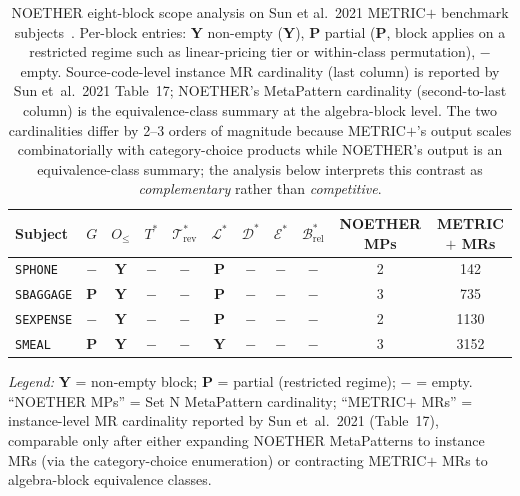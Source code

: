 \documentclass[acmsmall, screen]{acmart}
\newcommand{\cmark}{\textbf{Y}}
\newcommand{\xmark}{\ensuremath{-}}
\newcommand{\tildemark}{\textbf{P}}
\begin{document}
\begin{table}[h]
\centering
\caption{NOETHER eight-block scope analysis on Sun et al.~2021 METRIC$+$
benchmark subjects~\cite{SunMETRICplus2021}. Per-block entries: \textbf{Y}
non-empty (\cmark), \textbf{P} partial (\tildemark, block applies on a
restricted regime such as linear-pricing tier or within-class
permutation), \xmark{} empty. Source-code-level instance MR cardinality
(last column) is
reported by Sun et~al.\ 2021 Table~17; NOETHER's MetaPattern cardinality
(second-to-last column) is the equivalence-class summary at the
algebra-block level. The two cardinalities differ by 2--3 orders of
magnitude because METRIC$+$'s output scales combinatorially with
category-choice products while NOETHER's output is an equivalence-class
summary; the analysis below interprets this contrast as
\emph{complementary} rather than \emph{competitive}.}
\label{tab:metricplus-sun2021-scope}
\footnotesize
\begin{tabular}{l c c c c c c c c c c}
\toprule
Subject & $G$ & $O_{\le}$ & $T^{*}$ & $\mathcal{T}^{*}_{\mathrm{rev}}$ & $\mathcal{L}^{*}$ & $\mathcal{D}^{*}$ & $\mathcal{E}^{*}$ & $\mathcal{B}^{*}_{\mathrm{rel}}$ & NOETHER MPs & METRIC$+$ MRs \\
\midrule
\texttt{SPHONE}    & \xmark   & \cmark   & \xmark & \xmark & \tildemark & \xmark & \xmark & \xmark & 2 & 142 \\
\texttt{SBAGGAGE}  & \tildemark & \cmark & \xmark & \xmark & \tildemark & \xmark & \xmark & \xmark & 3 & 735 \\
\texttt{SEXPENSE}  & \xmark   & \cmark   & \xmark & \xmark & \tildemark & \xmark & \xmark & \xmark & 2 & 1130 \\
\texttt{SMEAL}     & \tildemark & \cmark & \xmark & \xmark & \cmark   & \xmark & \xmark & \xmark & 3 & 3152 \\
\bottomrule
\end{tabular}

\smallskip
\footnotesize
\textit{Legend:} \textbf{Y} = non-empty block; \textbf{P} = partial
(restricted regime); \xmark{} = empty. ``NOETHER MPs'' = Set N
MetaPattern cardinality; ``METRIC$+$ MRs'' = instance-level MR
cardinality reported by Sun et~al.~2021 (Table~17), comparable
only after either expanding NOETHER MetaPatterns to instance MRs
(via the category-choice enumeration) or contracting METRIC$+$ MRs
to algebra-block equivalence classes.
\end{table}
\end{document}
